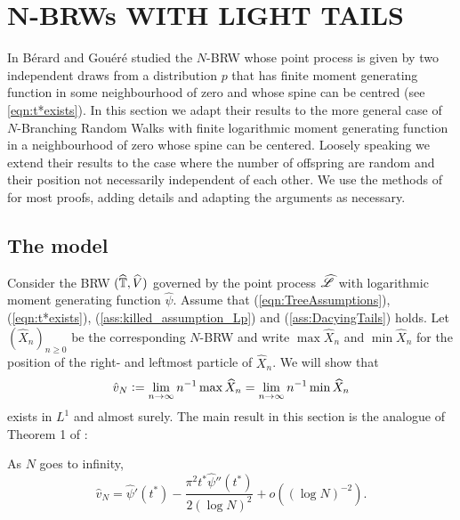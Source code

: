 \section{N-BRWs WITH LIGHT TAILS}\label{sec:light_tails}

In \cite{exp_tails} Bérard and Gouéré studied the $N$-BRW whose point process is given by two independent draws from a distribution $p$ that has finite moment generating function in some neighbourhood of zero and whose spine can be centred (see \ref{eqn:t*exists}). In this section we adapt their results to the more general case of $N$-Branching Random Walks with finite logarithmic moment generating function in a neighbourhood of zero whose spine can be centered. Loosely speaking we extend their results to the case where the number of offspring are random and their position not necessarily independent of each other. We use the methods of \cite{exp_tails} for most proofs, adding details and adapting the arguments as necessary. 

\subsection{The model}\label{subsec:The_model}
Consider the BRW $(\widehat{\mathbb{T}}, \widehat{V})$ governed by the point process $\widehat{\mathscr{L}}$ with logarithmic moment generating function $\widehat{\psi}$. Assume that (\ref{eqn:TreeAssumptions}), (\ref{eqn:t*exists}), (\ref{ass:killed_assumption_Lp}) and (\ref{ass:DacyingTails}) holds. Let $(\widehat{X}_n)_{n \geq 0}$ be the corresponding $N$-BRW and write $\max \widehat{X}_n$ and $\min \widehat{X}_n$ for the position of the right- and leftmost particle of $\widehat{X}_n$. We will show that 
\begin{equation}\nonumber
\hat{v}_N \vcentcolon= \lim_{n \to \infty} n^{-1}\max\widehat{X}_n = \lim_{n \to \infty} n^{-1}\min\widehat{X}_n
\end{equation} 
exists in $L^1$ and almost surely. The main result in this section is the analogue of Theorem 1 of \cite{exp_tails}: 
\begin{theorem}\label{thm:ExpTails_BrunDer_non_transformed}
As $N$ goes to infinity, 
\begin{equation}\nonumber
\widehat{v}_N = \widehat{\psi}'(t^*) - \frac{\pi^2 t^* \widehat{\psi}''(t^*)}{2 (\log N)^2} + o((\log N)^{-2}). 
\end{equation}
\end{theorem}




